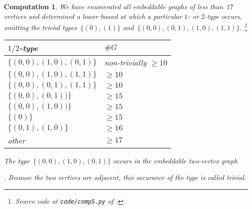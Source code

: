 \documentclass{report}
\newtheorem{comp}{Computation}[section]
\begin{document}
\begin{comp}\label{comp:types}
    We have enumerated all embeddable graphs of less than~$17$ vertices
    and determined a lower bound at which a particular $1$- or $2$-type occurs,
    omitting the trivial types~$\{(0),(1)\}$
    and~$\{(0,0),(0,1),(1,0),(1,1)\}$.%
        \footnote{Source code at \texttt{code/comp5.py} of \cite{GH}.}
    \begin{center}
    \begin{tabular}{ll}
        $1/2$-type & $\#G$ \\ \hline
        $\{(0,0), (1,0), (0,1)\}$ &
            non-trivially $\geq 10$\\ 
        $\{(0,0), (1,0), (1,1)\}$ & $\geq 10$ \\
        $\{(0,0), (0,1), (1,1)\}$ & $\geq 10$ \\
        $\{(0,0), (0,1))\}$ & $\geq 15$ \\
        $\{(0,0), (1,0))\}$ & $\geq 15$ \\
        $\{(0)\}$ & $\geq 15$ \\
        $\{(0,1),(1,0)\}$ & $\geq 16$ \\
        other & $\geq 17$
    \end{tabular}
    \end{center}
    The type~$\{(0,0),(1,0),(0,1)\}$ occurs in the embeddable two-vertex
    graph
    .
    Because the two vertices are adjacent, this occurance of
    the type is called trivial.
\end{comp}
\end{document}

